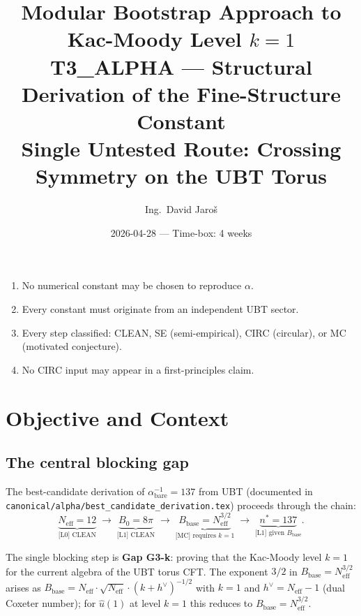 \documentclass[12pt,a4paper]{article}
\title{\textbf{Modular Bootstrap Approach to Kac-Moody Level $k = 1$}\\[6pt]
  \large T3\_ALPHA — Structural Derivation of the Fine-Structure Constant\\[4pt]
  \normalsize Single Untested Route: Crossing Symmetry on the UBT Torus}
\author{Ing.\ David Jaroš}
\date{2026-04-28 — Time-box: 4 weeks}
\theoremstyle{definition}
\theoremstyle{remark}
\begin{document}
\maketitle

\begin{tcolorbox}[enhanced,colback=orange!5!white,colframe=orange!60!black,
  arc=3pt,boxrule=1.2pt,title={\textbf{Hard Rules (Non-Negotiable)}}]
\begin{enumerate}
  \item No numerical constant may be chosen to reproduce $\alpha$.
  \item Every constant must originate from an independent UBT sector.
  \item Every step classified: CLEAN, SE (semi-empirical), CIRC (circular),
        or MC (motivated conjecture).
  \item No CIRC input may appear in a first-principles claim.
\end{enumerate}
\end{tcolorbox}

\tableofcontents

\section{Objective and Context}
\label{sec:objective}

\subsection{The central blocking gap}

The best-candidate derivation of $\alpha^{-1}_{\mathrm{bare}} = 137$ from UBT
(documented in \texttt{canonical/alpha/best\_candidate\_derivation.tex}) proceeds
through the chain:
\[
  \underbrace{N_{\mathrm{eff}} = 12}_{\text{[L0] CLEAN}}
  \;\longrightarrow\;
  \underbrace{B_0 = 8\pi}_{\text{[L1] CLEAN}}
  \;\longrightarrow\;
  \underbrace{B_{\mathrm{base}} = N_{\mathrm{eff}}^{3/2}}_{\text{[MC] requires }k=1}
  \;\longrightarrow\;
  \underbrace{n^* = 137}_{\text{[L1] given }B_{\mathrm{base}}}.
\]

The single blocking step is \textbf{Gap G3-k}: proving that the Kac-Moody level
$k = 1$ for the current algebra of the UBT torus CFT.  The exponent $3/2$ in
$B_{\mathrm{base}} = N_{\mathrm{eff}}^{3/2}$ arises as
$B_{\mathrm{base}} = N_{\mathrm{eff}} \cdot \sqrt{N_{\mathrm{eff}}} \cdot (k+h^\vee)^{-1/2}$
with $k = 1$ and $h^\vee = N_{\mathrm{eff}} - 1$ (dual Coxeter number); for
$\hat{u}(1)$ at level $k = 1$ this reduces to $B_{\mathrm{base}} = N_{\mathrm{eff}}^{3/2}$.
\end{document}
